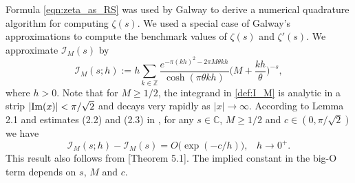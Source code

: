 \documentclass[12pt]{article}
\def\im{\textnormal {Im}}
\def\c{{\mathbb C}}
\def\ii{{\mathcal I}}
\theoremstyle{definition}
\begin{document}
Formula \eqref{eqn:zeta_as_RS} was used by Galway \cite{Galway_2001} to derive a numerical quadrature algorithm for computing $\zeta(s)$. We used a special case of Galway's approximations to compute the benchmark values of $\zeta(s)$ and $\zeta'(s)$. We approximate $\ii_M(s)$ by 
\begin{equation}\label{def_ii_M_sh}
\ii_M(s;h):=h \sum\limits_{k \in {\mathbb Z}} 
\frac{e^{-\pi (kh)^2-2\pi M  \theta  kh}}{\cosh(\pi \theta kh)} 
 \Big(M+\frac{kh}{\theta}\Big)^{-s},
\end{equation} 
where $h>0$. Note that for $M\ge 1/2$, the integrand in \eqref{def:I_M} is analytic in a strip $|\im(x)|<\pi/\sqrt{2}$ and decays very rapidly as $|x| \to \infty$. 
According to Lemma 2.1 and estimates (2.2) and (2.3) in \cite{Galway_2001}, for any $s\in \c$, $M\ge 1/2$ and $c\in (0,\pi/\sqrt{2})$  we have
\begin{equation}\label{I_M_sh_error}
\ii_M(s;h)-\ii_M(s)=O\big(\exp(-c /h)\big), \;\;\; h\to 0^+. 
\end{equation}
This result also follows from \cite{Trefethen2014}[Theorem 5.1]. The implied constant in the  big-O term depends on $s$, $M$ and $c$.
\end{document}
